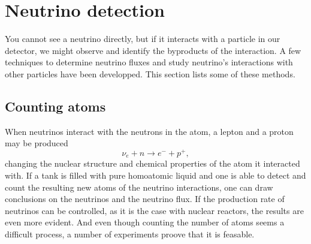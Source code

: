 \section{Neutrino detection}

You cannot see a neutrino directly, but if it interacts with a particle in our detector, we might observe and identify the byproducts of the interaction.
A few techniques to determine neutrino fluxes and study neutrino's interactions with other particles have been developped.
This section lists some of these methods.

\subsection{Counting atoms}
When neutrinos interact with the neutrons in the atom, a lepton and a proton may be produced
\begin{equation*}
  \nu_e + n \to e^- + p^+,
\end{equation*}
changing the nuclear structure and chemical properties of the atom it interacted with.
If a tank is filled with pure homoatomic liquid and one is able to detect and count the resulting new atoms of the neutrino interactions, one can draw conclusions on the neutrinos and the neutrino flux.
If the production rate of neutrinos can be controlled, as it is the case with nuclear reactors, the results are even more evident.
And even though counting the number of atoms seems a difficult process, a number of experiments proove that it is feasable.

